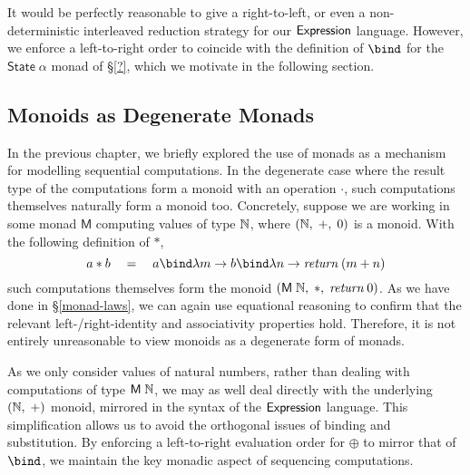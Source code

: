 \noindent It would be perfectly reasonable to give a right-to-left, or even
a non-deterministic interleaved reduction strategy for our $\mathsf{Expression}$
language. However, we enforce a left-to-right order to coincide with the
definition of $\bind$ for the $\mathsf{State}\;\alpha$ monad of \S\ref{?},
which we motivate in the following section.


\subsection{Monoids as Degenerate Monads}\label{sec:monoid}%

In the previous chapter, we briefly explored the use of monads as
a mechanism for modelling sequential computations. In the degenerate case
where the result type of the computations form a monoid with an operation
$\cdot$, such computations themselves naturally form a monoid too.
Concretely, suppose we are working in some monad $\mathsf{M}$ computing
values of type $\mathbb{N}$, where $(\mathbb{N},\;+,\;0)$ is a monoid. With the
following definition of $\ast$,
\[
	a \ast b \quad=\quad
		a \bind \lambda m \rightarrow
		b \bind \lambda n \rightarrow
		\textit{return}\;(m + n)
\]
such computations themselves form the monoid
$(\mathsf{M}\;\mathbb{N},\;\ast,\;\textit{return}\;0)$. As we have done in
\S\ref{monad-laws}, we can again use equational reasoning to confirm that
the relevant left-/right-identity and associativity properties hold.
Therefore, it is not entirely unreasonable to view monoids as a degenerate
form of monads.

As we only consider values of natural numbers, rather than dealing with
computations of type $\mathsf{M}\;\mathbb{N}$, we may as well deal directly with
the underlying $(\mathbb{N},\;+)$ monoid, mirrored in the syntax of the
$\mathsf{Expression}$ language. This simplification allows us to avoid the
orthogonal issues of binding and substitution. By enforcing a left-to-right
evaluation order for $\oplus$ to mirror that of $\bind$, we maintain the key
monadic aspect of sequencing computations.


